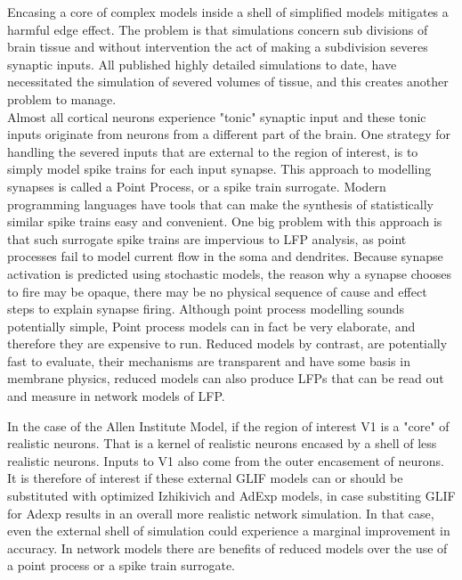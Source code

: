 Encasing a core of complex models inside a shell of simplified models mitigates a harmful edge effect. The problem is that simulations concern sub divisions of brain tissue and without intervention the act of making a subdivision severes synaptic inputs. All published highly detailed simulations to date, have necessitated the simulation of severed volumes of tissue, and this creates another problem to manage.\\
Almost all cortical neurons experience "tonic" synaptic input and these tonic inputs originate from neurons from a different part of the brain. One strategy for handling the severed inputs that are external to the region of interest, is to simply model spike trains for each input synapse. This approach to modelling synapses is called a Point Process, or a spike train surrogate. Modern programming languages have tools that can make the synthesis of statistically similar spike trains easy and convenient. One big problem with this approach is that such surrogate spike trains are impervious to LFP analysis, as point processes fail to model current flow in the soma and dendrites. Because synapse activation is predicted using stochastic models, the reason why a synapse chooses to fire may be opaque, there may be no physical sequence of cause and effect steps to explain synapse firing. Although point process modelling sounds potentially simple, Point process models can in fact be very elaborate, and therefore they are expensive to run. Reduced models by contrast, are potentially fast to evaluate, their mechanisms are transparent and have some basis in membrane physics, reduced models can also produce LFPs that can be read out and measure in network models of LFP.

In the case of the Allen Institute Model, if the region of interest V1 is a "core" of realistic neurons. That is a kernel of realistic neurons encased by a shell of less realistic neurons. Inputs to V1 also come from the outer encasement of neurons. It is therefore of interest if these external GLIF models can or should be substituted with optimized Izhikivich and AdExp models, in case substiting GLIF for Adexp results in an overall more realistic network simulation. In that case, even the external shell of simulation could experience a marginal improvement in accuracy. In network models there are benefits of reduced models over the use of a point process or a spike train surrogate.\\

